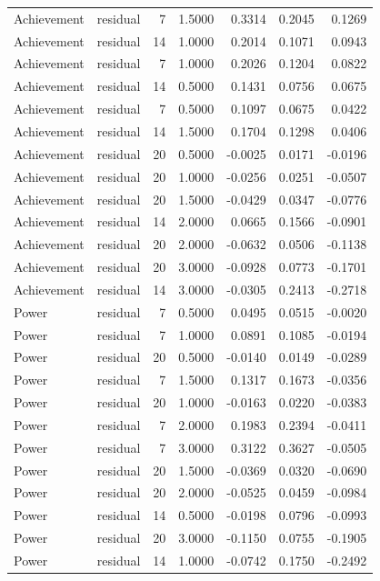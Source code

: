 \begin{tabular}{llrrrrr}
Achievement & residual & 7 & 1.5000 & 0.3314 & 0.2045 & 0.1269 \\
Achievement & residual & 14 & 1.0000 & 0.2014 & 0.1071 & 0.0943 \\
Achievement & residual & 7 & 1.0000 & 0.2026 & 0.1204 & 0.0822 \\
Achievement & residual & 14 & 0.5000 & 0.1431 & 0.0756 & 0.0675 \\
Achievement & residual & 7 & 0.5000 & 0.1097 & 0.0675 & 0.0422 \\
Achievement & residual & 14 & 1.5000 & 0.1704 & 0.1298 & 0.0406 \\
Achievement & residual & 20 & 0.5000 & -0.0025 & 0.0171 & -0.0196 \\
Achievement & residual & 20 & 1.0000 & -0.0256 & 0.0251 & -0.0507 \\
Achievement & residual & 20 & 1.5000 & -0.0429 & 0.0347 & -0.0776 \\
Achievement & residual & 14 & 2.0000 & 0.0665 & 0.1566 & -0.0901 \\
Achievement & residual & 20 & 2.0000 & -0.0632 & 0.0506 & -0.1138 \\
Achievement & residual & 20 & 3.0000 & -0.0928 & 0.0773 & -0.1701 \\
Achievement & residual & 14 & 3.0000 & -0.0305 & 0.2413 & -0.2718 \\
Power & residual & 7 & 0.5000 & 0.0495 & 0.0515 & -0.0020 \\
Power & residual & 7 & 1.0000 & 0.0891 & 0.1085 & -0.0194 \\
Power & residual & 20 & 0.5000 & -0.0140 & 0.0149 & -0.0289 \\
Power & residual & 7 & 1.5000 & 0.1317 & 0.1673 & -0.0356 \\
Power & residual & 20 & 1.0000 & -0.0163 & 0.0220 & -0.0383 \\
Power & residual & 7 & 2.0000 & 0.1983 & 0.2394 & -0.0411 \\
Power & residual & 7 & 3.0000 & 0.3122 & 0.3627 & -0.0505 \\
Power & residual & 20 & 1.5000 & -0.0369 & 0.0320 & -0.0690 \\
Power & residual & 20 & 2.0000 & -0.0525 & 0.0459 & -0.0984 \\
Power & residual & 14 & 0.5000 & -0.0198 & 0.0796 & -0.0993 \\
Power & residual & 20 & 3.0000 & -0.1150 & 0.0755 & -0.1905 \\
Power & residual & 14 & 1.0000 & -0.0742 & 0.1750 & -0.2492 \\

\end{tabular}
